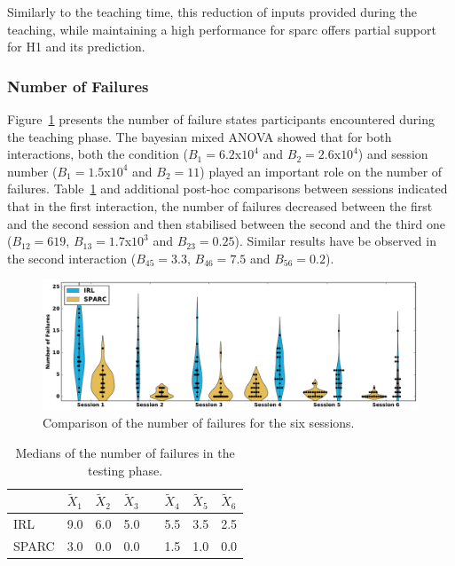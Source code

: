 Similarly to the teaching time, this reduction of inputs provided during the teaching, while maintaining a high performance for \gls{sparc} offers partial support for H1 and its prediction.

\subsubsection{Number of Failures}

Figure~\ref{fig:control_failures} presents the number of failure states participants encountered during the teaching phase. The bayesian mixed ANOVA showed that for both interactions, both the condition ($B_1=6.2$x$10^4$ and $B_2 = 2.6$x$10^4$) and session number ($B_1=1.5$x$10^4$ and $B_2 = 11$) played an important role on the number of failures. Table~\ref{tab:control_failures} and additional post-hoc comparisons between sessions indicated that in the first interaction, the number of failures decreased between the first and the second session and then stabilised between the second and the third one ($B_{12}=619$, $B_{13}=1.7$x$10^3$ and $B_{23}=0.25$). Similar results have be observed in the second interaction ($B_{45}=3.3$, $B_{46}=7.5$ and $B_{56}=0.2$).

\begin{figure}[ht]
	\includegraphics[width=\textwidth]{failures.pdf}
	\centering
	\caption{Comparison of the number of failures for the six sessions.
	}
	\label{fig:control_failures}
\end{figure}

\begin{table}[ht]
	\centering
	\caption{Medians of the number of failures in the testing phase.}
	\label{tab:control_failures}
	\begin{tabular}{@{}llllllll@{}}\toprule
		& $\widetilde{X}_{1}$ & $\widetilde{X}_{2}$ & $\widetilde{X}_{3}$ && $\widetilde{X}_{4}$ & $\widetilde{X}_{5}$ & $\widetilde{X}_{6}$\\ 
		\midrule
	    IRL & 9.0 & 6.0 & 5.0 &\crossarr& 5.5 & 3.5 & 2.5\\
	    SPARC & 3.0 & 0.0 & 0.0 && 1.5 & 1.0 & 0.0\\
	    \bottomrule
	\end{tabular}
\end{table}

